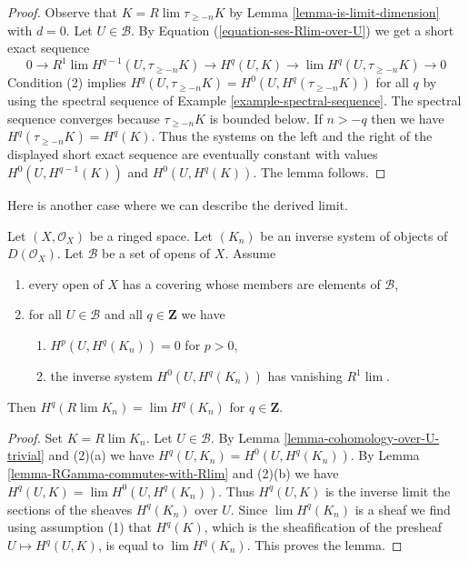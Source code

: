 \begin{proof}
Observe that $K = R\lim \tau_{\geq -n} K$ by
Lemma \ref{lemma-is-limit-dimension} with $d = 0$.
Let $U \in \mathcal{B}$. By Equation (\ref{equation-ses-Rlim-over-U})
we get a short exact sequence
$$
0 \to R^1\lim H^{q - 1}(U, \tau_{\geq -n}K) \to
H^q(U, K) \to \lim H^q(U, \tau_{\geq -n}K) \to 0
$$
Condition (2) implies
$H^q(U, \tau_{\geq -n} K) = H^0(U, H^q(\tau_{\geq -n} K))$
for all $q$ by using the spectral sequence of
Example \ref{example-spectral-sequence}.
The spectral sequence converges because $\tau_{\geq -n}K$ is bounded
below. If $n > -q$ then we have $H^q(\tau_{\geq -n}K) = H^q(K)$.
Thus the systems on the left and the right of the displayed
short exact sequence are eventually constant with values
$H^0(U, H^{q - 1}(K))$ and $H^0(U, H^q(K))$. The lemma follows.
\end{proof}

\noindent
Here is another case where we can describe the derived limit.

\begin{lemma}
\label{lemma-derived-limit-suitable-system}
Let $(X, \mathcal{O}_X)$ be a ringed space. Let $(K_n)$
be an inverse system of objects of $D(\mathcal{O}_X)$.
Let $\mathcal{B}$ be a set of opens of $X$. Assume
\begin{enumerate}
\item every open of $X$ has a covering whose members are
elements of $\mathcal{B}$,
\item for all $U \in \mathcal{B}$ and all $q \in \mathbf{Z}$ we have
\begin{enumerate}
\item $H^p(U, H^q(K_n)) = 0$ for $p > 0$,
\item the inverse system $H^0(U, H^q(K_n))$ has vanishing $R^1\lim$.
\end{enumerate}
\end{enumerate}
Then $H^q(R\lim K_n) = \lim H^q(K_n)$ for $q \in \mathbf{Z}$.
\end{lemma}

\begin{proof}
Set $K = R\lim K_n$. Let $U \in \mathcal{B}$.
By Lemma \ref{lemma-cohomology-over-U-trivial} and (2)(a)
we have $H^q(U, K_n) = H^0(U, H^q(K_n))$. By
Lemma \ref{lemma-RGamma-commutes-with-Rlim} and (2)(b) we have
$H^q(U, K) = \lim H^0(U, H^q(K_n))$. Thus $H^q(U, K)$ is the inverse limit
the sections of the sheaves $H^q(K_n)$ over $U$. Since
$\lim H^q(K_n)$ is a sheaf we find using assumption (1) that $H^q(K)$,
which is the sheafification of the presheaf $U \mapsto H^q(U, K)$,
is equal to $\lim H^q(K_n)$. This proves the lemma.
\end{proof}








